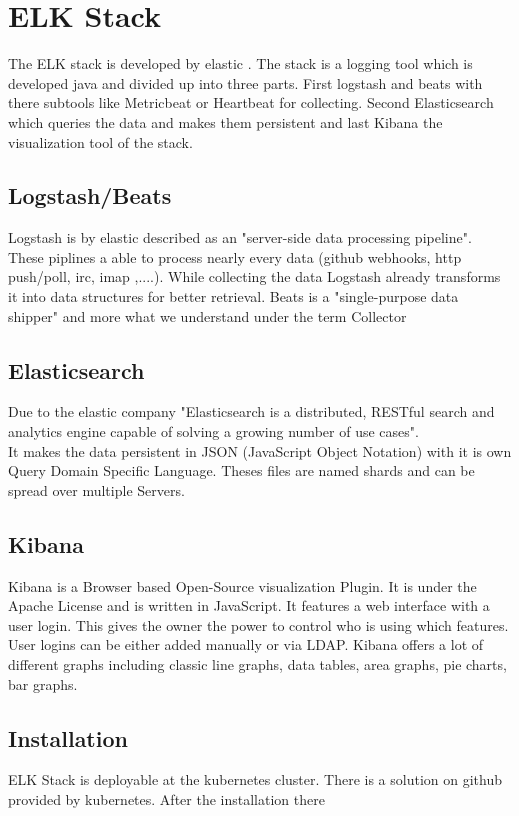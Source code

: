 \section{ELK Stack }
\label{elk} %
The ELK stack is developed by elastic \cite{elasticsearch}. 
The stack is a logging tool which is developed java and divided up into three parts. First  logstash and beats with there subtools like Metricbeat or Heartbeat for collecting. Second Elasticsearch which queries the data and makes them persistent and last Kibana the visualization tool of the stack.
\subsection{Logstash/Beats}
Logstash is by elastic described as an 
"server-side data processing pipeline"\cite{elasticsearch}. These piplines a able to process nearly every data (github webhooks, http push/poll, irc, imap ,....).
While collecting the data Logstash already transforms it into data structures for better retrieval.
Beats is a "single-purpose data shipper"\cite{elasticsearch} and more what we understand under the term Collector
\subsection{Elasticsearch}
\label{Elasticsearch}
Due to the elastic company "Elasticsearch is a distributed, RESTful search and analytics engine capable of solving a growing number of use cases"\cite{elasticsearch}.\\ It makes the data persistent in JSON (JavaScript Object Notation) with it is own Query Domain Specific Language. Theses files are named shards and can be spread over multiple Servers.
\subsection{Kibana}
Kibana is a Browser based Open-Source visualization Plugin. It is under the Apache License and is written in JavaScript. It features a web interface with a user login. This gives the owner the power to control who is using which features. User logins can be either added manually or via LDAP.
Kibana offers a lot of different graphs including classic line graphs, data tables, area graphs, pie charts, bar graphs.
\subsection{Installation}
ELK Stack is deployable at the kubernetes cluster. There is a solution on github provided by kubernetes. After the installation there 
